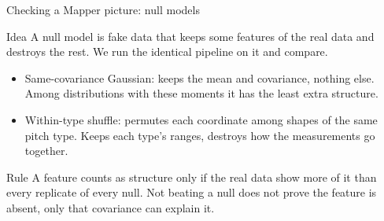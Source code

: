 \documentclass[aspectratio=169]{beamer}
\newcommand{\src}[1]{\par\vspace{2pt}\hfill{\scriptsize\textcolor{gray}{\parencite{#1}}}}
\begin{document}
\begin{frame}{Checking a Mapper picture: null models}
\begin{block}{Idea}
A \alert{null model} is fake data that keeps some features of the real data and destroys the rest. We run the identical pipeline on it and compare.
\src{blumberg2014,robinsonturner2017,topaz2026null}
\end{block}
\begin{itemize}\small
  \item \alert{Same-covariance Gaussian}: keeps the mean and covariance, nothing else. Among distributions with these moments it has the least extra structure.
  \item \alert{Within-type shuffle}: permutes each coordinate among shapes of the same pitch type. Keeps each type's ranges, destroys how the measurements go together.
\end{itemize}
\begin{block}{Rule}
A feature counts as structure only if the real data show \alert{more} of it than every replicate of every null. Not beating a null does not prove the feature is absent, only that covariance can explain it.
\end{block}
\end{frame}

\end{document}
